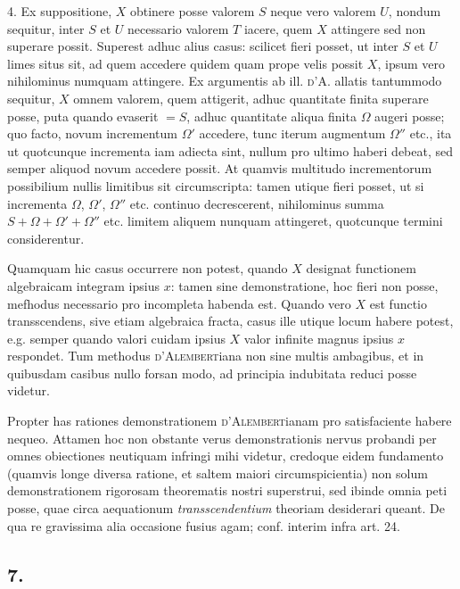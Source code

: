 \documentclass[14pt]{memoir}
\theoremstyle{plain}
\theoremstyle{remark}
\begin{document}
4. Ex suppositione, \(X\) obtinere posse valorem \(S\) neque vero valorem \(U\), nondum sequitur, inter \(S\) et \(U\) necessario valorem \(T\) iacere, quem \(X\) attingere sed non superare possit. Superest adhuc alius casus: scilicet fieri posset, ut inter \(S\) et \(U\) limes situs sit, ad quem accedere quidem quam prope velis possit \(X\), ipsum vero nihilominus numquam attingere. Ex argumentis ab ill. \textsc{d'A.} allatis tantummodo sequitur, \(X\) omnem valorem, quem attigerit, adhuc quantitate finita superare posse, puta quando evaserit \(= S\), adhuc quantitate aliqua finita \(\Omega\) augeri posse; quo facto, novum incrementum \(\Omega'\) accedere, tunc iterum augmentum \(\Omega''\) etc., ita ut quotcunque incrementa iam adiecta sint, nullum pro ultimo haberi debeat, sed semper aliquod novum accedere possit. At quamvis multitudo incrementorum possibilium nullis limitibus sit circumscripta: tamen utique fieri posset, ut si incrementa \(\Omega\), \(\Omega'\), \(\Omega''\) etc. continuo decrescerent, nihilominus summa \(S +\Omega + \Omega' + \Omega''\) etc. limitem aliquem nunquam attingeret, quotcunque termini considerentur.

Quamquam hic casus occurrere non potest, quando \(X\) designat functionem algebraicam integram ipsius \(x\): tamen sine demonstratione, hoc fieri non posse, mefhodus necessario pro incompleta habenda est. Quando vero \(X\) est functio transscendens, sive etiam algebraica fracta, casus ille utique locum habere potest, e.g. semper quando valori cuidam ipsius \(X\) valor infinite magnus ipsius \(x\) respondet. Tum methodus \textsc{d'Alembert}iana non sine multis ambagibus, et in quibusdam casibus nullo forsan modo, ad principia indubitata reduci posse videtur.


Propter has rationes demonstrationem \textsc{d'Alembert}ianam pro satisfaciente habere nequeo. Attamen hoc non obstante verus demonstrationis nervus probandi per omnes obiectiones neutiquam infringi mihi videtur, credoque eidem fundamento (quamvis longe diversa ratione, et saltem maiori circumspicientia) non solum demonstrationem rigorosam theorematis nostri superstrui, sed ibinde omnia peti posse, quae circa aequationum \textit{transscendentium} theoriam desiderari queant. De qua re gravissima alia occasione fusius agam; conf. interim infra art. 24.

\subsection*{7.}
\end{document}
